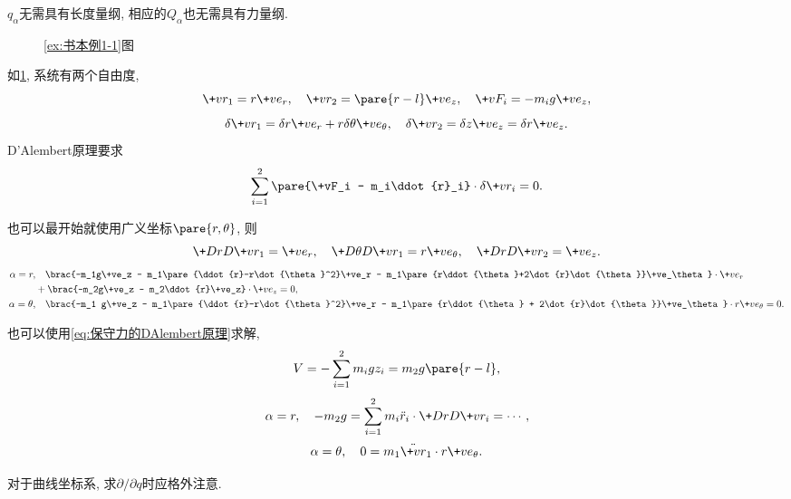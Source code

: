 \documentclass{ctexart}
\begin{document}
\begin{pitfall}
    $q_\alpha$无需具有长度量纲, 相应的$Q_\alpha$也无需具有力量纲.
\end{pitfall}
\begin{figure}[ht]
    \centering
    \caption{\cref{ex:书本例1-1}图}
    \label{fig:书本例1-1图}
\end{figure}
\begin{sample}
    \begin{ex}
        \label{ex:书本例1-1}
        如\cref{fig:书本例1-1图}, 系统有两个自由度,
        \[ \+vr_1 = r\+ve_r,\quad \+vr_2 = \pare{r-l}\+ve_z,\quad \+vF_i = -m_ig\+ve_z, \]
        \[ \delta \+vr_1 = \delta r\+ve_r + r\delta\theta\+ve_\theta,\quad \delta\+vr_2 = \delta z\+ve_z = \delta r\+ve_z. \]
        D'Alembert原理要求
        \[ \sum_{i=1}^2 \pare{\+vF_i - m_i\ddot{r}_i}\cdot\delta\+vr_i = 0. \]
    \end{ex}
    \begin{ex}
        也可以最开始就使用广义坐标$\pare{r,\theta}$, 则
        \[ \+DrD{\+vr_1} = \+ve_r,\quad \+D{\theta}D{\+vr_1} = r\+ve_\theta,\quad \+D{r}D{\+vr_2} = \+ve_z. \]
        \begin{align*}
            \alpha = r,&\quad \brac{-m_1g\+ve_z - m_1\pare{\ddot{r}-r\dot{\theta}^2}\+ve_r - m_1\pare{r\ddot{\theta}+2\dot{r}\dot{\theta}}\+ve_\theta}\cdot\+ve_r\\ &+ \brac{-m_2g\+ve_z - m_2\ddot{r}\+ve_z}\cdot\+ve_z = 0, \\
            \alpha = \theta, &\quad \brac{-m_1 g\+ve_z - m_1\pare{\ddot{r}-r\dot{\theta}^2}\+ve_r - m_1\pare{r\ddot{\theta} + 2\dot{r}\dot{\theta}}\+ve_\theta}\cdot r\+ve_\theta = 0.
        \end{align*}
    \end{ex}
    \begin{ex}
        也可以使用\eqref{eq:保守力的DAlembert原理}求解,
        \[ V = -\sum_{i=1}^2 m_i gz_i = m_2g\pare{r-l}, \]
        \[ \alpha =r,\quad -m_2 g = \sum_{i=1}^2 m_i\ddot{r}_i\cdot\+D{r}D{\+vr_i} = \cdots, \]
        \[ \alpha=\theta,\quad 0 = m_1 \ddot{\+vr}_1 \cdot r\+ve_\theta. \]
    \end{ex}
\end{sample}
\begin{pitfall}
    对于曲线坐标系, 求$\partial/\partial q$时应格外注意.
\end{pitfall}
\end{document}
